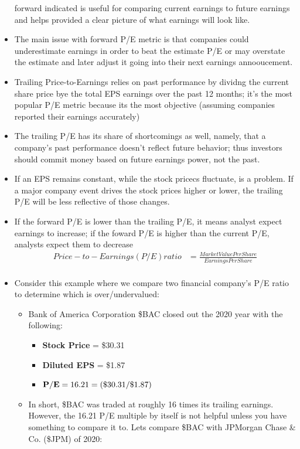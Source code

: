 \documentclass{article}
\begin{document}
\begin{itemize}
				forward indicated is useful for comparing current earnings to future earnings and helps provided a clear picture of what earnings will look like.
			\item The main issue with forward P/E metric is that companies could underestimate earnings in order to beat the estimate P/E or may overstate the estimate and later adjust it going into their next earnings annooucement.
			\item Trailing Price-to-Earnings relies on past performance by dividng the current share price bye the total EPS earnings over the past 12 months; it's the most popular P/E metric because its the most objective (assuming companies reported their earnings accurately)
			\item The trailing P/E has its share of shortcomings as well, namely, that a company's past performance doesn't reflect future behavior; thus investors should commit money based on future earnings power, not the past.
			\item If an EPS remains constant, while the stock pricecs fluctuate, is a problem. If a major company event drives the stock prices higher or lower, the trailing P/E will be less reflective of those changes.
			\item If the forward P/E is lower than the trailing P/E, it means analyst expect earnings to increase; if the foward P/E is higher than the current P/E, analysts expect them to decrease
			\begin{align*}
				Price-to-Earnings (P/E) ratio &= \frac{Market Value Per Share}{Earnings Per Share}\\
			\end{align*}
			\item Consider this example where we compare two financial company's P/E ratio to determine which is over/undervalued:
				\begin{itemize}
					\item Bank of America Corporation \$BAC closed out the 2020 year with the following:
						\begin{itemize}
							\item {\bf Stock Price} = \$30.31
							\item {\bf Diluted EPS} = \$1.87
							\item ${\bf P/E} = 16.21 = (\$30.31/\$1.87)$
						\end{itemize}
					\item In short, \$BAC was traded at roughly 16 times its trailing earnings. However, the 16.21 P/E multiple by itself is not helpful unless you have something to compare it to. Lets compare \$BAC with JPMorgan Chase \& Co. (\$JPM) of 2020:

\end{itemize}
\end{itemize}
\end{document}
